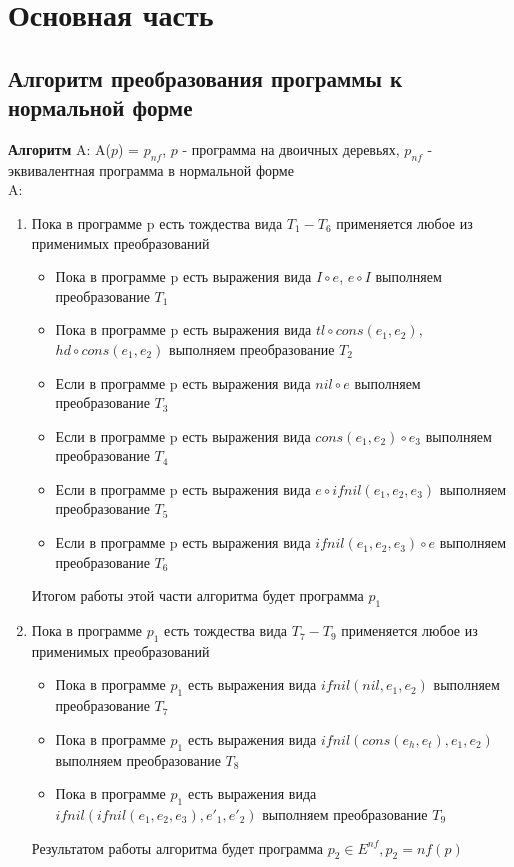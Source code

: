 \documentclass[12pt]{article}
\begin{document}
\section{Основная часть}

\subsection{Алгоритм преобразования программы к нормальной форме}
\textbf{Алгоритм} A: A($p$) = $p_{nf}$, $p$ - программа на двоичных деревьях, $p_{nf}$ - эквивалентная программа в нормальной форме\\
A:
\begin{enumerate}
	\item Пока в программе p есть тождества вида $T_{1}-T_{6}$ применяется любое из применимых преобразований
	\begin{itemize}
		\item Пока в программе p есть выражения вида $I \circ e$, $e \circ I$ выполняем преобразование $T_{1}$
		\item Пока в программе p есть выражения вида $tl \circ cons(e_{1}, e_{2})$, $hd \circ cons(e_{1}, e_{2})$ выполняем преобразование $T_{2}$
		\item Если в программе p есть выражения вида $nil \circ e$ выполняем преобразование $T_{3}$
		\item Если в программе p есть выражения вида $cons(e_{1}, e_{2}) \circ  e_{3}$ выполняем преобразование $T_{4}$
		\item Если в программе p есть выражения вида $e \circ ifnil(e_{1}, e_{2}, e_{3})$ выполняем преобразование $T_{5}$
		\item Если в программе p есть выражения вида $ifnil(e_{1}, e_{2}, e_{3}) \circ e$ выполняем преобразование $T_{6}$
	\end{itemize}
	Итогом работы этой части алгоритма будет программа $p_{1}$
	\item Пока в программе \(p_{1}\) есть тождества вида $T_{7}-T_{9}$ применяется любое из применимых преобразований
	\begin{itemize}
		\item Пока в программе $p_{1}$ есть выражения вида $ifnil(nil, e_{1}, e_{2})$ выполняем преобразование \(T_{7}\)
		\item Пока в программе $p_{1}$ есть выражения вида $ifnil(cons(e_{h}, e_{t}), e_{1}, e_{2})$ выполняем преобразование $T_{8}$
		\item Пока в программе $p_{1}$ есть выражения вида $ifnil(ifnil(e_{1}, e_{2}, e_{3}), e'_{1}, e'_{2})$ выполняем преобразование $T_{9}$
	\end{itemize}
	Результатом работы алгоритма будет программа $p_{2} \in E^{nf}, p_{2} = nf(p)$
\end{enumerate}
\end{document}
